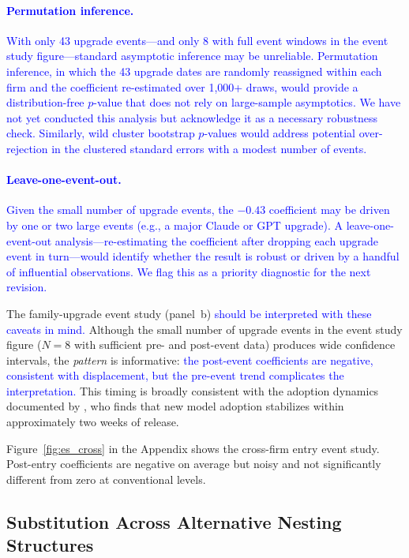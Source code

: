 \documentclass[11pt, a4paper]{article}
\begin{document}
\textcolor{blue}{\paragraph{Permutation inference.} With only 43 upgrade events---and only 8 with full event windows in the event study figure---standard asymptotic inference may be unreliable. Permutation inference, in which the 43 upgrade dates are randomly reassigned within each firm and the coefficient re-estimated over 1,000+ draws, would provide a distribution-free $p$-value that does not rely on large-sample asymptotics. We have not yet conducted this analysis but acknowledge it as a necessary robustness check. Similarly, wild cluster bootstrap $p$-values would address potential over-rejection in the clustered standard errors with a modest number of events.}

\textcolor{blue}{\paragraph{Leave-one-event-out.} Given the small number of upgrade events, the $-0.43$ coefficient may be driven by one or two large events (e.g., a major Claude or GPT upgrade). A leave-one-event-out analysis---re-estimating the coefficient after dropping each upgrade event in turn---would identify whether the result is robust or driven by a handful of influential observations. We flag this as a priority diagnostic for the next revision.}

The family-upgrade event study (panel~b) \textcolor{blue}{should be interpreted with these caveats in mind.} Although the small number of upgrade events in the event study figure ($N = 8$ with sufficient pre- and post-event data) produces wide confidence intervals, the \emph{pattern} is informative: \textcolor{blue}{the post-event coefficients are negative, consistent with displacement, but the pre-event trend complicates the interpretation.} This timing is broadly consistent with the adoption dynamics documented by \citet{fradkin2025demand}, who finds that new model adoption stabilizes within approximately two weeks of release.

Figure~\ref{fig:es_cross} in the Appendix shows the cross-firm entry event study. Post-entry coefficients are negative on average but noisy and not significantly different from zero at conventional levels.

\subsection{Substitution Across Alternative Nesting Structures}
\end{document}
